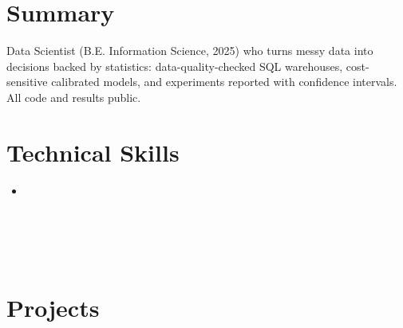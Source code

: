 






\section{Summary}
\small{Data Scientist (B.E. Information Science, 2025) who turns messy data into decisions backed by statistics: data-quality-checked SQL warehouses, cost-sensitive calibrated models, and experiments reported with confidence intervals. All code and results public.}

\section{Technical Skills}
 \begin{itemize}[leftmargin=0.15in, label={}]
    \item \small{
     \skillData \\
     \skillEval \\
     \skillML \\
     \skillLang \\
     \skillMLOps \\
     \skillLLM
    }
 \end{itemize}
 \vspace{-14pt}



\section{Projects}
  \resumeSubHeadingListStart

    

    

    

    

    

  \resumeSubHeadingListEnd






